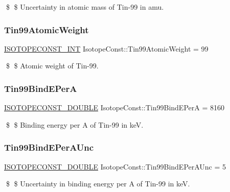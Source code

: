 \$ \$ Uncertainty in atomic mass of Tin-\/99 in amu. \mbox{\label{group___isotope_const-_tin-_sn99_gab233481171dcf70360b0de13548ae40a}} 
\subsubsection{\texorpdfstring{Tin99\+Atomic\+Weight}{Tin99AtomicWeight}}
{\footnotesize\ttfamily \mbox{\hyperlink{group___isotope_const-_macros_ga5f18360b3e99483a35c32d789e62621c}{I\+S\+O\+T\+O\+P\+E\+C\+O\+N\+S\+T\+\_\+\+I\+NT}} Isotope\+Const\+::\+Tin99\+Atomic\+Weight = 99}

\$ \$ Atomic weight of Tin-\/99. \mbox{\label{group___isotope_const-_tin-_sn99_ga97c6e4edfff89acd4d81f8512b4ede93}} 
\subsubsection{\texorpdfstring{Tin99\+Bind\+E\+PerA}{Tin99BindEPerA}}
{\footnotesize\ttfamily \mbox{\hyperlink{group___isotope_const-_macros_ga8f45a7272ce02c0b4c65c44636ed719a}{I\+S\+O\+T\+O\+P\+E\+C\+O\+N\+S\+T\+\_\+\+D\+O\+U\+B\+LE}} Isotope\+Const\+::\+Tin99\+Bind\+E\+PerA = 8160}

\$ \$ Binding energy per A of Tin-\/99 in keV. \mbox{\label{group___isotope_const-_tin-_sn99_ga88298edfb09bffc7bda1c833206625d2}} 
\subsubsection{\texorpdfstring{Tin99\+Bind\+E\+Per\+A\+Unc}{Tin99BindEPerAUnc}}
{\footnotesize\ttfamily \mbox{\hyperlink{group___isotope_const-_macros_ga8f45a7272ce02c0b4c65c44636ed719a}{I\+S\+O\+T\+O\+P\+E\+C\+O\+N\+S\+T\+\_\+\+D\+O\+U\+B\+LE}} Isotope\+Const\+::\+Tin99\+Bind\+E\+Per\+A\+Unc = 5}

\$ \$ Uncertainty in binding energy per A of Tin-\/99 in keV. \mbox{\label{group___isotope_const-_tin-_sn99_ga85327bd2c5f698e1a70b7b5466433d4e}} 
